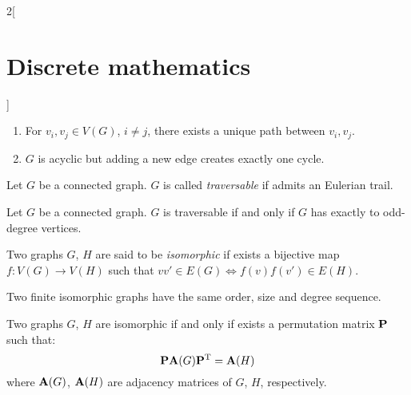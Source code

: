 \documentclass[../../../main.tex]{subfiles}
\begin{document}
\begin{multicols}{2}[\section{Discrete mathematics}]
\begin{prop}
\begin{enumerate}
      \item For $v_i,v_j\in V(G)$, $i\ne j$, there exists a unique path between $v_i,v_j$.
      \item $G$ is acyclic but adding a new edge creates exactly one cycle.
    \end{enumerate}
  \end{prop}
  \begin{definition}
    Let $G$ be a connected graph. $G$ is called \textit{traversable} if admits an Eulerian trail.
  \end{definition}
  \begin{theorem}
    Let $G$ be a connected graph. $G$ is traversable if and only if $G$ has exactly to odd-degree vertices.
  \end{theorem}
  \begin{definition}
    Two graphs $G$, $H$ are said to be \textit{isomorphic} if exists a bijective map $f:V(G)\rightarrow V(H)$ such that $vv'\in E(G)\iff f(v)f(v')\in E(H)$.
  \end{definition}
  \begin{prop}
    Two finite isomorphic graphs have the same order, size and degree sequence.
  \end{prop}
  \begin{theorem}
    Two graphs $G$, $H$ are isomorphic if and only if exists a permutation matrix $\boldsymbol{\mathrm{P}}$ such that: $$\boldsymbol{\mathrm{P}}\boldsymbol{\mathrm{A}}(G)\vb{P}^{\mathrm{T}}=\boldsymbol{\mathrm{A}}(H)$$ where $\boldsymbol{\mathrm{A}}(G)$, $\boldsymbol{\mathrm{A}}(H)$ are adjacency matrices of $G$, $H$, respectively.
  \end{theorem}

\end{multicols}
\end{document}
